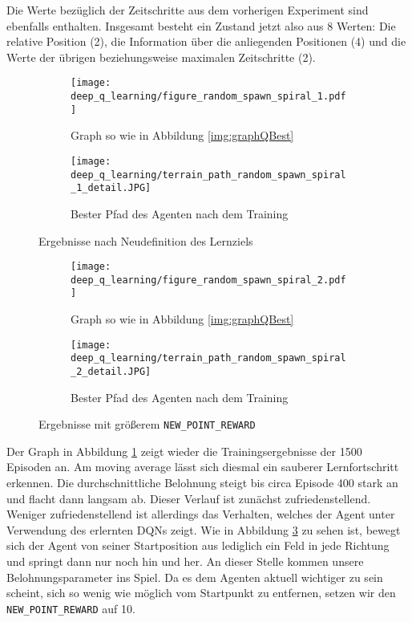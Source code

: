 Die Werte bezüglich der Zeitschritte aus dem vorherigen Experiment sind ebenfalls enthalten. Insgesamt besteht ein Zustand jetzt also aus 8 Werten: Die relative Position (2), die Information über die anliegenden Positionen (4) und die Werte der übrigen beziehungsweise maximalen Zeitschritte (2).
\begin{figure}[h!]
    \centering
    \begin{subfigure}[b]{0.59\textwidth}
        \texttt{[image: deep\_q\_learning/figure\_random\_spawn\_spiral\_1.pdf]}
        \caption{Graph so wie in Abbildung \ref{img:graphQBest}}
        \label{img:graphDeepQRandomSpawnSpiral1}
    \end{subfigure}
    \begin{subfigure}[b]{0.4\textwidth}
        \texttt{[image: deep\_q\_learning/terrain\_path\_random\_spawn\_spiral\_1\_detail.JPG]}
        \caption{Bester Pfad des Agenten nach dem Training}
        \label{img:pathDeepQRandomSpawnSpiral1}
    \end{subfigure}
    \caption{Ergebnisse nach Neudefinition des Lernziels}
\end{figure}
\begin{figure}[h!]
    \centering
    \begin{subfigure}[b]{0.59\textwidth}
        \texttt{[image: deep\_q\_learning/figure\_random\_spawn\_spiral\_2.pdf]}
        \caption{Graph so wie in Abbildung \ref{img:graphQBest}}
        \label{img:graphDeepQRandomSpawnSpiral2}
    \end{subfigure}
    \begin{subfigure}[b]{0.4\textwidth}
        \texttt{[image: deep\_q\_learning/terrain\_path\_random\_spawn\_spiral\_2\_detail.JPG]}
        \caption{Bester Pfad des Agenten nach dem Training}
        \label{img:pathDeepQRandomSpawnSpiral2}
    \end{subfigure}
    \caption{Ergebnisse mit größerem \texttt{NEW_POINT_REWARD}}
\end{figure}
Der Graph in Abbildung \ref{img:graphDeepQRandomSpawnSpiral1} zeigt wieder die Trainingsergebnisse der 1500 Episoden an. Am moving average lässt sich diesmal ein sauberer Lernfortschritt erkennen. Die durchschnittliche Belohnung steigt bis circa Episode 400 stark an und flacht dann langsam ab. Dieser Verlauf ist zunächst zufriedenstellend. Weniger zufriedenstellend ist allerdings das Verhalten, welches der Agent unter Verwendung des erlernten DQNs zeigt. Wie in Abbildung \ref{img:pathDeepQRandomSpawnSpiral1} zu sehen ist, bewegt sich der Agent von seiner Startposition aus lediglich ein Feld in jede Richtung und springt dann nur noch hin und her.
An dieser Stelle kommen unsere Belohnungsparameter ins Spiel. Da es dem Agenten aktuell wichtiger zu sein scheint, sich so wenig wie möglich vom Startpunkt zu entfernen, setzen wir den \texttt{NEW_POINT_REWARD} auf 10.

